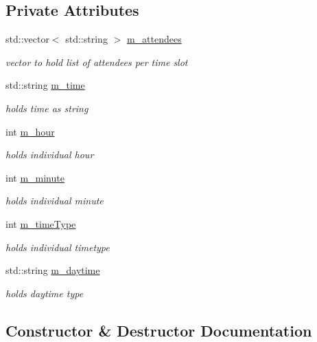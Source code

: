 \subsection*{Private Attributes}
\begin{DoxyCompactItemize}
\item 
std\+::vector$<$ std\+::string $>$ \hyperlink{classTime_a2fdac16a4a9fc67f75aafb66a8622ff6}{m\+\_\+attendees}
\begin{DoxyCompactList}\small\item\em vector to hold list of attendees per time slot \end{DoxyCompactList}\item 
std\+::string \hyperlink{classTime_ab36d723cbc54f228022881c08a6b7214}{m\+\_\+time}
\begin{DoxyCompactList}\small\item\em holds time as string \end{DoxyCompactList}\item 
int \hyperlink{classTime_ae1c5e59897218c6e143bf257472d4d0a}{m\+\_\+hour}
\begin{DoxyCompactList}\small\item\em holds individual hour \end{DoxyCompactList}\item 
int \hyperlink{classTime_a52a8fa26ca15a3e7052735a6431389e8}{m\+\_\+minute}
\begin{DoxyCompactList}\small\item\em holds individual minute \end{DoxyCompactList}\item 
int \hyperlink{classTime_a5c5860d4bbda747ff81a93269da9a36c}{m\+\_\+time\+Type}
\begin{DoxyCompactList}\small\item\em holds individual timetype \end{DoxyCompactList}\item 
std\+::string \hyperlink{classTime_a0f59908673009a02433b68e70d0c8ccb}{m\+\_\+daytime}
\begin{DoxyCompactList}\small\item\em holds daytime type \end{DoxyCompactList}\end{DoxyCompactItemize}


\subsection{Constructor \& Destructor Documentation}
